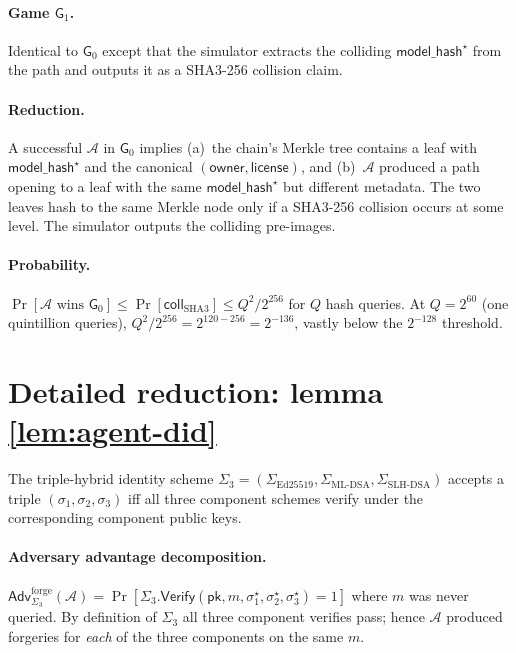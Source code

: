 \documentclass[11pt]{article}
\begin{document}
\paragraph{Game $\mathsf{G}_1$.} Identical to $\mathsf{G}_0$ except
that the simulator extracts the colliding
$\mathsf{model\_hash}^\star$ from the path and outputs it as a
SHA3-256 collision claim.

\paragraph{Reduction.} A successful $\mathcal{A}$ in
$\mathsf{G}_0$ implies (a)~the chain's Merkle tree contains a leaf
with $\mathsf{model\_hash}^\star$ and the canonical
$(\mathsf{owner}, \mathsf{license})$, and (b)~$\mathcal{A}$ produced
a path opening to a leaf with the same
$\mathsf{model\_hash}^\star$ but different metadata. The two leaves
hash to the same Merkle node only if a SHA3-256 collision occurs at
some level. The simulator outputs the colliding pre-images.

\paragraph{Probability.} $\Pr[\mathcal{A}\text{ wins }\mathsf{G}_0]
\leq \Pr[\mathsf{coll}_{\mathrm{SHA3}}] \leq Q^2 / 2^{256}$ for $Q$
hash queries.  At $Q = 2^{60}$ (one quintillion queries),
$Q^2 / 2^{256} = 2^{120 - 256} = 2^{-136}$, vastly below the
$2^{-128}$ threshold.

\section{Detailed reduction: lemma \ref{lem:agent-did}}
\label{sec:reduct-did}

The triple-hybrid identity scheme $\Sigma_3 =
(\Sigma_{\mathrm{Ed25519}}, \Sigma_{\mathrm{ML\text{-}DSA}},
 \Sigma_{\mathrm{SLH\text{-}DSA}})$ accepts a triple
$(\sigma_1, \sigma_2, \sigma_3)$ iff all three component schemes
verify under the corresponding component public keys.

\paragraph{Adversary advantage decomposition.}
$\mathsf{Adv}^{\mathrm{forge}}_{\Sigma_3}(\mathcal{A}) =
 \Pr[\Sigma_3.\mathsf{Verify}(\mathsf{pk}, m, \sigma_1^\star,
                              \sigma_2^\star, \sigma_3^\star) = 1]$
where $m$ was never queried.  By definition of $\Sigma_3$ all three
component verifies pass; hence $\mathcal{A}$ produced forgeries for
\emph{each} of the three components on the same $m$.
\end{document}
